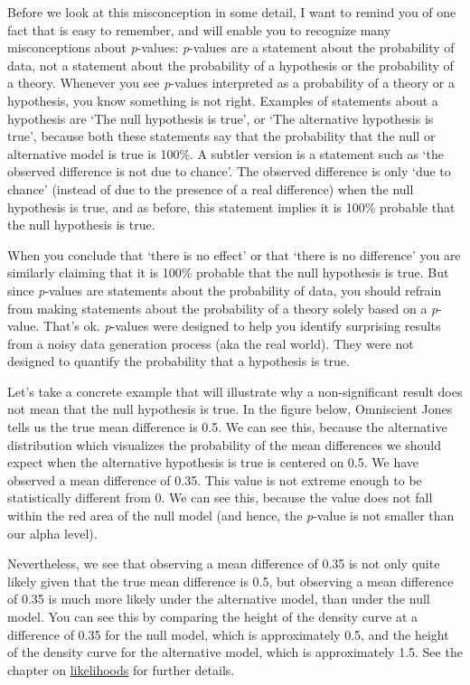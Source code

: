 \documentclass[
  oneside]{book}
\begin{document}
Before we look at this misconception in some detail, I want to remind you of one fact that is easy to remember, and will enable you to recognize many misconceptions about \emph{p}-values: \emph{p}-values are a statement about the probability of data, not a statement about the probability of a hypothesis or the probability of a theory. Whenever you see \emph{p}-values interpreted as a probability of a theory or a hypothesis, you know something is not right. Examples of statements about a hypothesis are `The null hypothesis is true', or `The alternative hypothesis is true', because both these statements say that the probability that the null or alternative model is true is 100\%. A subtler version is a statement such as `the observed difference is not due to chance'. The observed difference is only `due to chance' (instead of due to the presence of a real difference) when the null hypothesis is true, and as before, this statement implies it is 100\% probable that the null hypothesis is true.

When you conclude that `there is no effect' or that `there is no difference' you are similarly claiming that it is 100\% probable that the null hypothesis is true. But since \emph{p}-values are statements about the probability of data, you should refrain from making statements about the probability of a theory solely based on a \emph{p}-value. That's ok. \emph{p}-values were designed to help you identify surprising results from a noisy data generation process (aka the real world). They were not designed to quantify the probability that a hypothesis is true.

Let's take a concrete example that will illustrate why a non-significant result does not mean that the null hypothesis is true. In the figure below, Omniscient Jones tells us the true mean difference is 0.5. We can see this, because the alternative distribution which visualizes the probability of the mean differences we should expect when the alternative hypothesis is true is centered on 0.5. We have observed a mean difference of 0.35. This value is not extreme enough to be statistically different from 0. We can see this, because the value does not fall within the red area of the null model (and hence, the \emph{p}-value is not smaller than our alpha level).

Nevertheless, we see that observing a mean difference of 0.35 is not only quite likely given that the true mean difference is 0.5, but observing a mean difference of 0.35 is much more likely under the alternative model, than under the null model. You can see this by comparing the height of the density curve at a difference of 0.35 for the null model, which is approximately 0.5, and the height of the density curve for the alternative model, which is approximately 1.5. See the chapter on \protect\hyperlink{likettest}{likelihoods} for further details.
\end{document}
